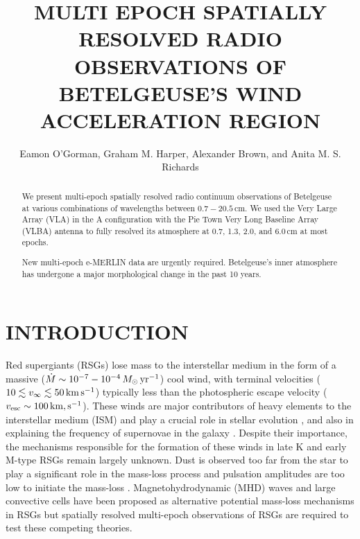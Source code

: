 \documentclass[iop]{emulateapj}
\begin{document}
\title{MULTI EPOCH SPATIALLY RESOLVED RADIO OBSERVATIONS OF BETELGEUSE'S WIND ACCELERATION REGION}


\author{Eamon O'Gorman, Graham M. Harper, Alexander Brown, and Anita M. S. Richards}



\begin{abstract}
We present multi-epoch spatially resolved radio continuum observations of Betelgeuse at various combinations of wavelengths between $0.7-20.5$\,cm.  We used the Very Large Array (VLA) in the A configuration with the Pie Town Very Long Baseline Array (VLBA) antenna to fully resolved its atmosphere at 0.7, 1.3, 2.0, and 6.0\,cm at most epochs.


 New multi-epoch e-MERLIN data are urgently required. Betelgeuse's inner atmosphere has undergone a major morphological change in the past 10 years.

\end{abstract}


\section{INTRODUCTION}
Red supergiants (RSGs) lose mass to the interstellar medium in the form of a massive ($\dot{M} \sim 10^{-7} - 10^{-4}\,M_{\odot}\,\rm{yr}^{-1}$) cool wind, with terminal velocities ($10\lesssim v_{\infty}\lesssim 50\,{\rm{km}}\,\rm{s}^{-1}$) typically less than the photospheric escape velocity  ($v_{\rm{esc}} \sim 100\,\rm{km},\rm{s}^{-1}$). These winds are major contributors of heavy elements to the interstellar medium (ISM) and play a crucial role in stellar evolution \citep{chiosi_1986}, and also in explaining the frequency of supernovae in the galaxy \citep[e.g.,][]{van_loon_2010}. Despite their importance, the mechanisms responsible for the formation of these winds in late K and early M-type RSGs remain largely unknown. Dust is observed too far from the star to play a significant role in the mass-loss process \citep{danchi_1994} and pulsation amplitudes are too low to initiate the mass-loss \citep{smith_1989}. Magnetohydrodynamic (MHD) waves \citep[e.g.,][]{thirumalai_2012} and large convective cells \citep[e.g.,][]{josselin_2007} have been proposed as alternative potential mass-loss mechanisms in RSGs but spatially resolved multi-epoch observations of RSGs are required to test these competing theories.
\end{document}
